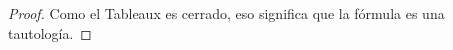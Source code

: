 \documentclass[letterpaper,11pt]{article}
\begin{document}
\begin{enumerate}
\begin{proof}
    Como el Tableaux es cerrado, eso significa que la fórmula es una 
    tautología.

    \end{proof}
\end{enumerate}
\end{document}
